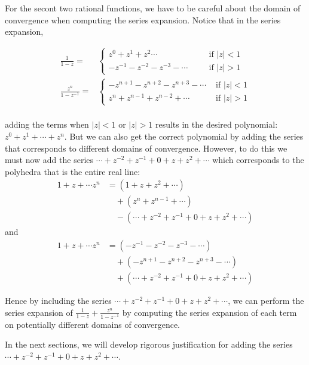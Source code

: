 For the secont two rational functions, we have to be careful about the domain of convergence when computing the series expansion. Notice that in the series expansion,

\begin{align*}
\frac{1}{1-z} =& \begin{cases} 
      z^0 + z^1 + z^2 \cdots & \;\;\;\;\; \text{ if } |z| < 1 \\
      -z^{-1} -z^{-2} - z^{-3} - \cdots & \;\;\;\;\; \text{ if }  |z| > 1 
   \end{cases} \\
\frac{z^n}{1-z^{-1}} =& \begin{cases} 
		-z^{n+1} - z^{n+2} - z^{n+3} -\cdots & \text{ if } |z| < 1 \\
      z^{n} + z^{n-1} + z^{n-2} + \cdots & \text{ if }  |z| > 1 
   \end{cases} \\
\end{align*}


adding the terms when $|z| <1$  or $|z| > 1$ results in the desired polynomial: $z^0 + z^1 + \cdots + z^n$. But we can also get the correct polynomial by adding the series that corresponds to different domains of convergence. However, to do this we must now add the series $\cdots + z^{-2} + z^{-1} + 0 + z + z^2 + \cdots$ which corresponds to the polyhedra that is the entire real line:
\begin{align*}
1 + z + \cdots z^n &= (1 + z + z^2 + \cdots)\\
& \quad  + (z^n + z^{n-1} + \cdots)  \\
& \quad - (\cdots + z^{-2} + z^{-1} + 0 + z + z^2 + \cdots)
\end{align*}
and
\begin{align*}
1 + z + \cdots z^n &= (-z^{-1} -z^{-2} - z^{-3} - \cdots)\\
& \quad  + (-z^{n+1} - z^{n+2} - z^{n+3} -\cdots)  \\
& \quad + (\cdots + z^{-2} + z^{-1} + 0 + z + z^2 + \cdots)
\end{align*}

Hence by including the series $\cdots + z^{-2} + z^{-1} + 0 + z + z^2 + \cdots$, we can perform the series expansion of $\frac{1}{1-z} + \frac{z^n}{1-z^{-1}}$ by computing the series expansion of each term on potentially different domains of convergence. 

In the next sections, we will develop rigorous justification for adding the series  $\cdots + z^{-2} + z^{-1} + 0 + z + z^2 + \cdots$.
 
